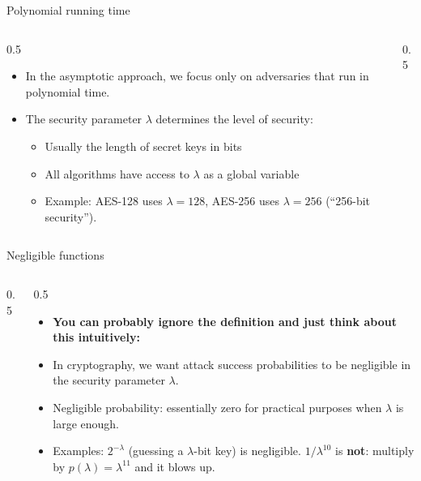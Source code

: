 \ifdefined\PRESENTATION\else\PassOptionsToClass{handout}{beamer}\fi\documentclass[aspectratio=169, lualatex]{beamer}
\begin{document}
\begin{frame}{Polynomial running time}
	\begin{columns}[c]
		\begin{column}{0.5\textwidth}
			\begin{itemize}
				\item In the asymptotic approach, we focus only on adversaries that run in polynomial time.
				\item The security parameter $\lambda$ determines the level of security:
				      \begin{itemize}
					      \item Usually the length of secret keys in bits
					      \item All algorithms have access to $\lambda$ as a global variable
					      \item Example: AES-128 uses $\lambda = 128$, AES-256 uses $\lambda = 256$ (``256-bit security'').
				      \end{itemize}
			\end{itemize}
		\end{column}
		\begin{column}{0.5\textwidth}
		\end{column}
	\end{columns}
\end{frame}

\begin{frame}{Negligible functions}
	\begin{columns}[c]
		\begin{column}{0.5\textwidth}
		\end{column}
		\begin{column}{0.5\textwidth}
			\begin{itemize}
				\item \textbf{You can probably ignore the definition and just think about this intuitively:}
				\item In cryptography, we want attack success probabilities to be negligible in the security parameter $\lambda$.
				\item Negligible probability: essentially zero for practical purposes when $\lambda$ is large enough.
				\item Examples: $2^{-\lambda}$ (guessing a $\lambda$-bit key) is negligible. $1/\lambda^{10}$ is \textbf{not}: multiply by $p(\lambda) = \lambda^{11}$ and it blows up.
			\end{itemize}
		\end{column}
	\end{columns}
\end{frame}
\end{document}
